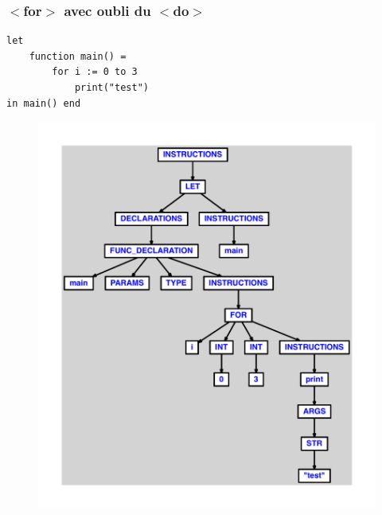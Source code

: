 \documentclass{article}
\begin{document}
\subsubsection{$ < $for$ > $ avec oubli du $ < $do$ > $}
\begin{lstlisting}
let
	function main() =
		for i := 0 to 3
			print("test")
in main() end
\end{lstlisting}
\newpage
\begin{figure}[H]
\centering
\includegraphics[max width=\textwidth]{ast/ast_198.pdf}
\end{figure}
\newpage
\end{document}
